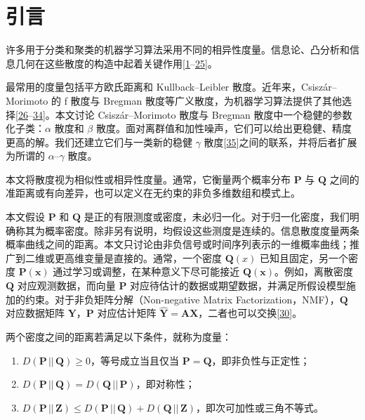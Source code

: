 \setcounter{section}{0}
\section{\texorpdfstring{引言}{引言}}
\label{sec1-entropy-12-01532}
许多用于分类和聚类的机器学习算法采用不同的相异性度量。信息论、凸分析和信息几何在这些散度的构造中起着关键作用[\hyperlink{B1-entropy-12-01532}{1}--\hyperlink{B25-entropy-12-01532}{25}]。


最常用的度量包括平方欧氏距离和 Kullback–Leibler 散度。近年来，Csiszár–Morimoto 的 f 散度与 Bregman 散度等广义散度，为机器学习算法提供了其他选择[\hyperlink{B26-entropy-12-01532}{26}--\hyperlink{B34-entropy-12-01532}{34}]。本文讨论 Csiszár–Morimoto 散度与 Bregman 散度中一个稳健的参数化子类：\(\alpha\) 散度和 \(\beta\) 散度。面对离群值和加性噪声，它们可以给出更稳健、精度更高的解。我们还建立它们与一类新的稳健 \(\gamma\) 散度[\hyperlink{B35-entropy-12-01532}{35}]之间的联系，并将后者扩展为所谓的 \(\alpha\)–\(\gamma\) 散度。


本文将散度视为相似性或相异性度量。通常，它衡量两个概率分布 \(\mathbf{P}\) 与 \(\mathbf{Q}\) 之间的准距离或有向差异，也可以定义在无约束的非负多维数组和模式上。


本文假设 \(\mathbf{P}\) 和 \(\mathbf{Q}\) 是正的有限测度或密度，未必归一化。对于归一化密度，我们明确称其为概率密度。除非另有说明，均假设这些测度是连续的。信息散度度量两条概率曲线之间的距离。本文只讨论由非负信号或时间序列表示的一维概率曲线；推广到二维或更高维变量是直接的。通常，一个密度 \(\mathbf{Q}(x)\) 已知且固定，另一个密度 \(\mathbf{P}(\mathbf{x})\) 通过学习或调整，在某种意义下尽可能接近 \(\mathbf{Q}(\mathbf{x})\)。例如，离散密度 \(\mathbf{Q}\) 对应观测数据，而向量 \(\mathbf{P}\) 对应待估计的数据或期望数据，并满足所假设模型施加的约束。对于非负矩阵分解（Non-negative Matrix Factorization，NMF），\(\mathbf{Q}\) 对应数据矩阵 \(\mathbf{Y}\)，\(\mathbf{P}\) 对应估计矩阵 \(\hat{\mathbf{Y}} = \mathbf{A}\mathbf{X}\)，二者也可以交换[\hyperlink{B30-entropy-12-01532}{30}]。


两个密度之间的距离若满足以下条件，就称为度量：

\begin{enumerate}
\item \(D(\mathbf{P}\,||\,\mathbf{Q}) \geq 0\)，等号成立当且仅当 \(\mathbf{P} = \mathbf{Q}\)，即非负性与正定性；


\item \(D(\mathbf{P}\,||\,\mathbf{Q}) = D(\mathbf{Q}\,||\,\mathbf{P})\)，即对称性；


\item \(D(\mathbf{P}\,||\,\mathbf{Z}) \leq D(\mathbf{P}\,||\,\mathbf{Q}) + D(\mathbf{Q}\,||\,\mathbf{Z})\)，即次可加性或三角不等式。

\end{enumerate}





